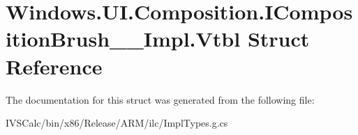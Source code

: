 \hypertarget{struct_windows_1_1_u_i_1_1_composition_1_1_i_composition_brush_____impl_1_1_vtbl}{}\section{Windows.\+U\+I.\+Composition.\+I\+Composition\+Brush\+\_\+\+\_\+\+Impl.\+Vtbl Struct Reference}
\label{struct_windows_1_1_u_i_1_1_composition_1_1_i_composition_brush_____impl_1_1_vtbl}


The documentation for this struct was generated from the following file\+:\begin{DoxyCompactItemize}
\item 
I\+V\+S\+Calc/bin/x86/\+Release/\+A\+R\+M/ilc/Impl\+Types.\+g.\+cs\end{DoxyCompactItemize}
